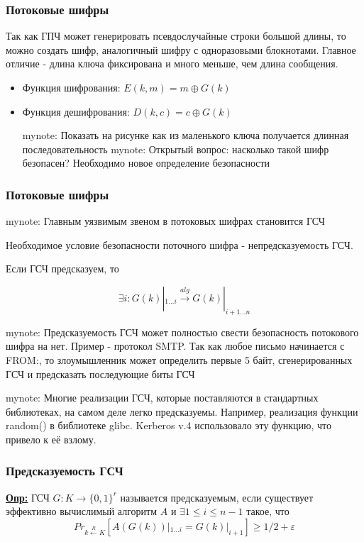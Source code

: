 \documentclass{beamer}
\newcommand{\longdef}[1]{{\textbf{\underline{Опр:}} #1}}
\newcommand{\set}[1]{{\lbrace #1 \rbrace}}
\newcommand{\mynote}[1]{mynote: #1}
\newcommand{\mynote}[1]{}
\begin{document}
\begin{frame}
  \frametitle{Потоковые шифры}

  Так как ГПЧ может генерировать псевдослучайные строки большой длины, то можно создать шифр,
  аналогичный шифру с одноразовыми блокнотами. Главное отличие - длина ключа фиксирована и много меньше, чем длина
  сообщения.

  \begin{itemize}
    \itemsep 2em
    \item{Функция шифрования: \newline
      $E(k,m)=m \oplus G(k)$}
    \item{Функция дешифрования: \newline
      $D(k,c)=c \oplus G(k)$}

    \mynote{Показать на рисунке как из маленького ключа получается длинная последовательность}
    \mynote{Открытый вопрос: насколько такой шифр безопасен? Необходимо новое определение безопасности}
  \end{itemize}

\end{frame}


\begin{frame}
  \frametitle{Потоковые шифры}

  \mynote{Главным уязвимым звеном в потоковых шифрах становится ГСЧ}

  Необходимое условие безопасности поточного шифра - непредсказуемость ГСЧ.

  \vspace{1em}

  Если ГСЧ предсказуем, то

  \[\exists i: G(k)|_{1 \ldots i} \stackrel{alg}{\longrightarrow} G(k)|_{i+1 \ldots n}\]

  \mynote{Предсказуемость ГСЧ может полностью свести безопасность потокового шифра на нет.
    Пример - протокол SMTP. Так как любое письмо начинается с FROM:, то злоумышленник может определить первые 5
    байт, сгенерированных ГСЧ и предсказать последующие биты ГСЧ}

  \mynote{Многие реализации ГСЧ, которые поставляются в стандартных библиотеках, на самом деле легко предсказуемы.
    Например, реализация функции random() в библиотеке glibc. Kerberos v.4 использовало эту функцию, что привело к её взлому.}

\end{frame}


\begin{frame}
  \frametitle{Предсказуемость ГСЧ}

  \longdef{ГСЧ $G:K \longrightarrow \set{0,1}^{r}$ называется предсказуемым, если существует
   эффективно вычислимый алгоритм $A$ и $\exists 1 \le i \le n-1$ такое, что
    \begin{displaymath}
      {Pr_{k \stackrel{R}{\longleftarrow} K}[A(G(k))|_{1 \ldots i} = G(k)|_{i+1}] \ge 1/2 + \varepsilon}
    \end{displaymath}
  }

\end{frame}
\end{document}
